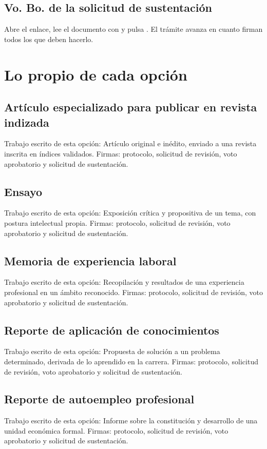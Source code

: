 \subsection{Vo. Bo. de la solicitud de sustentación}
Abre el enlace, lee el documento con  y pulsa . El trámite avanza en cuanto firman todos los que deben hacerlo.
\section{Lo propio de cada opción}
\subsection{Artículo especializado para publicar en revista indizada}
Trabajo escrito de esta opción: Artículo original e inédito, enviado a una revista inscrita en índices validados. Firmas: protocolo, solicitud de revisión, voto aprobatorio y solicitud de sustentación.
\subsection{Ensayo}
Trabajo escrito de esta opción: Exposición crítica y propositiva de un tema, con postura intelectual propia. Firmas: protocolo, solicitud de revisión, voto aprobatorio y solicitud de sustentación.
\subsection{Memoria de experiencia laboral}
Trabajo escrito de esta opción: Recopilación y resultados de una experiencia profesional en un ámbito reconocido. Firmas: protocolo, solicitud de revisión, voto aprobatorio y solicitud de sustentación.
\subsection{Reporte de aplicación de conocimientos}
Trabajo escrito de esta opción: Propuesta de solución a un problema determinado, derivada de lo aprendido en la carrera. Firmas: protocolo, solicitud de revisión, voto aprobatorio y solicitud de sustentación.
\subsection{Reporte de autoempleo profesional}
Trabajo escrito de esta opción: Informe sobre la constitución y desarrollo de una unidad económica formal. Firmas: protocolo, solicitud de revisión, voto aprobatorio y solicitud de sustentación.
